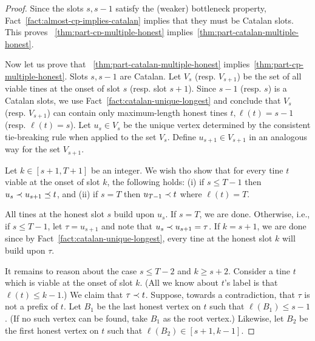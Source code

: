  \begin{proof}
    Since the slots $s, s - 1$ satisfy the (weaker) bottleneck property, 
    Fact~\ref{fact:almost-cp-implies-catalan} implies that 
    they must be Catalan slots. 
    This proves 
    ~\ref{thm:part-cp-multiple-honest} implies~\ref{thm:part-catalan-multiple-honest}.
    
    Now let us prove that ~\ref{thm:part-catalan-multiple-honest} implies~\ref{thm:part-cp-multiple-honest}. 
    Slots $s, s - 1$ are Catalan. 
    Let $V_{s}$ (resp. $V_{s+1}$) be the set of all viable tines 
    at the onset of slot $s$ (resp. slot $s + 1$). 
    Since $s - 1$ (resp. $s$) is a Catalan slots, we use 
    Fact~\ref{fact:catalan-unique-longest} and conclude that 
    $V_s$ (resp. $V_{s+1}$) can contain 
    only maximum-length honest tines $t, \ell(t) = s - 1$ (resp. $\ell(t) = s$). 
    Let $u_s \in V_s$ be the unique vertex determined 
    by the consistent tie-breaking rule when applied to the set $V_s$. 
    Define $u_{s+1} \in V_{s+1}$ in an analogous way for the set $V_{s+1}$.

    Let $k \in [s + 1, T+1]$ be an integer.
    We wish tho show that for every tine $t$ viable at the onset of slot $k$, 
    the following holds: 
    (i) if  $s \leq T - 1$ then $u_s \prec u_{s+1} \preceq t$, and 
    (ii) if $s = T$ then 
    $u_{T-1} \prec t$ where $\ell(t) = T$. 

    All tines at the honest slot $s$ build upon $u_s$. 
    If $s = T$, we are done. 
    Otherwise, i.e., if $s \leq T - 1$, 
    let $\tau = u_{s + 1}$ and note that $u_s \prec u_{s + 1} = \tau$. 
    If $k = s + 1$, we are done since by Fact~\ref{fact:catalan-unique-longest}, 
    every tine at the honest slot $k$ will build upon $\tau$.  

    It remains to reason about the case $s \leq T - 2$ and $k \geq s + 2$. 
    Consider a tine $t$ which is viable at the onset of slot $k$. 
    (All we know about $t$'s label is that $\ell(t) \leq k - 1$.) 
    We claim that $\tau \prec t$. 
    Suppose, towards a contradiction, that 
    $\tau$ is not a prefix of $t$. 
    Let $B_1$ be the last honest vertex on $t$ such that $\ell(B_1) \leq s - 1$.
    (If no such vertex can be found, take $B_1$ as the root vertex.) 
    Likewise, let $B_2$ be the first honest vertex on $t$ such that $\ell(B_2) \in [s + 1, k - 1]$. 
    

\end{proof}
